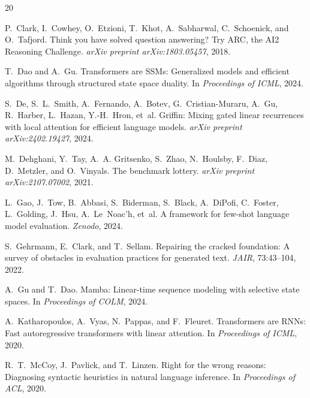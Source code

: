\documentclass[11pt]{article}
\begin{document}
\begin{thebibliography}{20}

P.~Clark, I.~Cowhey, O.~Etzioni, T.~Khot, A.~Sabharwal, C.~Schoenick, and O.~Tafjord.
\newblock Think you have solved question answering? Try {ARC}, the {AI2} Reasoning Challenge.
\newblock \emph{arXiv preprint arXiv:1803.05457}, 2018.

T.~Dao and A.~Gu.
\newblock Transformers are {SSMs}: Generalized models and efficient algorithms through structured state space duality.
\newblock In \emph{Proceedings of ICML}, 2024.

S.~De, S.~L.~Smith, A.~Fernando, A.~Botev, G.~Cristian-Muraru, A.~Gu, R.~Harber, L.~Hazan, Y.-H.~Hron, et~al.
\newblock Griffin: Mixing gated linear recurrences with local attention for efficient language models.
\newblock \emph{arXiv preprint arXiv:2402.19427}, 2024.

M.~Dehghani, Y.~Tay, A.~A. Gritsenko, S.~Zhao, N.~Houlsby, F.~Diaz, D.~Metzler, and O.~Vinyals.
\newblock The benchmark lottery.
\newblock \emph{arXiv preprint arXiv:2107.07002}, 2021.

L.~Gao, J.~Tow, B.~Abbasi, S.~Biderman, S.~Black, A.~DiPofi, C.~Foster, L.~Golding, J.~Hsu, A.~Le~Noac'h, et~al.
\newblock A framework for few-shot language model evaluation.
\newblock \emph{Zenodo}, 2024.

S.~Gehrmann, E.~Clark, and T.~Sellam.
\newblock Repairing the cracked foundation: A survey of obstacles in evaluation practices for generated text.
\newblock \emph{JAIR}, 73:43--104, 2022.

A.~Gu and T.~Dao.
\newblock Mamba: Linear-time sequence modeling with selective state spaces.
\newblock In \emph{Proceedings of COLM}, 2024.

A.~Katharopoulos, A.~Vyas, N.~Pappas, and F.~Fleuret.
\newblock Transformers are {RNNs}: Fast autoregressive transformers with linear attention.
\newblock In \emph{Proceedings of ICML}, 2020.

R.~T.~McCoy, J.~Pavlick, and T.~Linzen.
\newblock Right for the wrong reasons: Diagnosing syntactic heuristics in natural language inference.
\newblock In \emph{Proceedings of ACL}, 2020.


\end{thebibliography}
\end{document}
